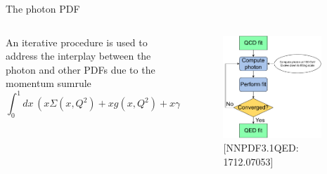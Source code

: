 \documentclass[aspectratio=169, 9pt,t]{beamer}
\begin{document}
\begin{frame}{The photon PDF}
  \begin{columns}[T]
    \begin{column}{0.59\textwidth}
      An iterative procedure  is used to address the interplay between the photon and other PDFs due to the momentum sumrule
      \begin{equation*}
        \int_0^1 dx\, \left(  x\Sigma(x,Q^2) + xg(x,Q^2) + x\gamma(x,Q^2) \right) =1
      \end{equation*}
    \end{column}

    \begin{column}{0.39\textwidth}
      \vspace*{-1.5em}
      \begin{figure}
        \includegraphics[width=0.9\textwidth]{figures/luxqed_iteration.pdf}
        \caption*{\color{gray}\small [NNPDF3.1QED: 1712.07053]}
      \end{figure}
    \end{column}
  \end{columns}

\end{frame}
\end{document}
